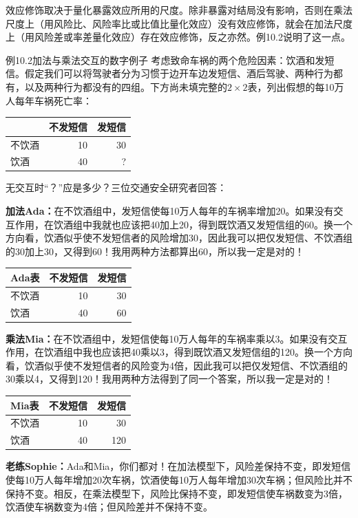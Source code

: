 效应修饰取决于量化暴露效应所用的尺度。除非暴露对结局没有影响，否则在乘法尺度上（用风险比、风险率比或比值比量化效应）没有效应修饰，就会在加法尺度上（用风险差或率差量化效应）存在效应修饰，反之亦然。例10.2说明了这一点。
\begin{bookbox}{例10.2\quad 加法与乘法交互的数字例子}
考虑致命车祸的两个危险因素：饮酒和发短信。假定我们可以将驾驶者分为习惯于边开车边发短信、酒后驾驶、两种行为都有，以及两种行为都没有的四组。下方尚未填完整的$2\times2$表，列出假想的每10万人每年车祸死亡率：
\begin{center}\begin{tabular}{lrr}\toprule&不发短信&发短信\\\midrule
不饮酒&10&30\\饮酒&40&?\\\bottomrule\end{tabular}\end{center}
无交互时“？”应是多少？三位交通安全研究者回答：

\textbf{加法Ada：}在不饮酒组中，发短信使每10万人每年的车祸率增加20。如果没有交互作用，在饮酒组中我就也应该把40加上20，得到既饮酒又发短信组的60。换一个方向看，饮酒似乎使不发短信者的风险增加30，因此我可以把仅发短信、不饮酒组的30加上30，又得到60！我用两种方法都算出60，所以我一定是对的！
\begin{center}\begin{tabular}{lrr}\toprule Ada表&不发短信&发短信\\\midrule
不饮酒&10&30\\饮酒&40&60\\\bottomrule\end{tabular}\end{center}
\textbf{乘法Mia：}在不饮酒组中，发短信使每10万人每年的车祸率乘以3。如果没有交互作用，在饮酒组中我也应该把40乘以3，得到既饮酒又发短信组的120。换一个方向看，饮酒似乎使不发短信者的风险变为4倍，因此我可以把仅发短信、不饮酒组的30乘以4，又得到120！我用两种方法得到了同一个答案，所以我一定是对的！
\begin{center}\begin{tabular}{lrr}\toprule Mia表&不发短信&发短信\\\midrule
不饮酒&10&30\\饮酒&40&120\\\bottomrule\end{tabular}\end{center}
\textbf{老练Sophie：}Ada和Mia，你们都对！在加法模型下，风险差保持不变，即发短信使每10万人每年增加20次车祸，饮酒使每10万人每年增加30次车祸；但风险比并不保持不变。相反，在乘法模型下，风险比保持不变，即发短信使车祸数变为3倍，饮酒使车祸数变为4倍；但风险差并不保持不变。


\end{bookbox}
